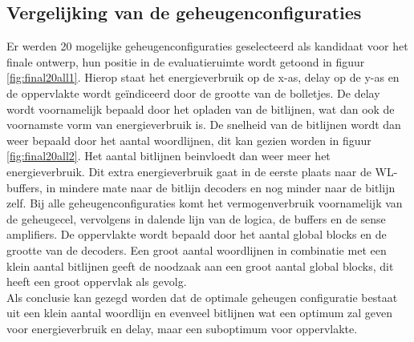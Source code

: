 \subsection{Vergelijking van de geheugenconfiguraties}
Er werden 20 mogelijke geheugenconfiguraties geselecteerd als kandidaat voor het finale ontwerp, hun positie in de evaluatieruimte wordt getoond in figuur \ref{fig:final20all1}. Hierop staat het energieverbruik op de x-as, delay op de y-as en de oppervlakte wordt geïndiceerd door de grootte van de bolletjes. De delay wordt voornamelijk bepaald door het opladen van de bitlijnen, wat dan ook de voornamste vorm van energieverbruik is. De snelheid van de bitlijnen wordt dan weer bepaald door het aantal woordlijnen, dit kan gezien worden in figuur \ref{fig:final20all2}. Het aantal bitlijnen beinvloedt dan weer meer het energieverbruik. Dit extra energieverbruik gaat in de eerste plaats naar de WL-buffers, in mindere mate naar de bitlijn decoders en nog minder naar de bitlijn zelf. Bij alle geheugenconfiguraties komt het vermogenverbruik voornamelijk van de geheugecel, vervolgens in dalende lijn van de logica, de buffers en de sense amplifiers. De oppervlakte wordt bepaald door het aantal global blocks en de grootte van de decoders. Een groot aantal woordlijnen in combinatie met een klein aantal bitlijnen geeft de noodzaak aan een groot aantal global blocks, dit heeft een groot oppervlak als gevolg.\\
Als conclusie kan gezegd worden dat de optimale geheugen configuratie bestaat uit een klein aantal woordlijn en evenveel bitlijnen wat een optimum zal geven voor energieverbruik en delay, maar een suboptimum voor oppervlakte.


